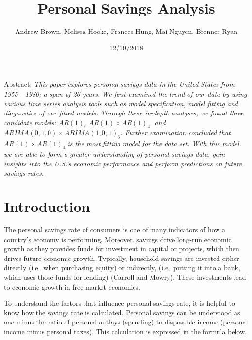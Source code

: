 \documentclass[]{article}
\title{Personal Savings Analysis}
\author{Andrew Brown, Melissa Hooke, Frances Hung, Mai Nguyen, Brenner Ryan}
\date{12/19/2018}
\begin{document}
\maketitle

Abstract:
\textit{This paper explores personal savings data in the United States from 1955 - 1980; a span of 26 years. We first examined the trend of our data by using various time series analysis tools such as model specification, model fitting and diagnostics of our fitted models. Through these in-depth analyses, we found three candidate models: $AR(1)$, $AR(1) \times AR(1)_4$, and $ARIMA(0,1,0) \times ARIMA(1,0,1)_6$. Further examination concluded that $AR(1) \times AR(1)_4$ is the most fitting model for the data set. With this model, we are able to form a greater understanding of personal savings data, gain insights into the U.S.’s economic performance and perform predictions on future savings rates.}

\newpage

\section{Introduction}\label{introduction}

The personal savings rate of consumers is one of many indicators of how
a country's economy is performing. Moreover, savings drive long-run
economic growth as they provides funds for investment in capital or
projects, which then drives future economic growth. Typically, household
savings are invested either directly (i.e.~when purchasing equity) or
indirectly, (i.e.~putting it into a bank, which uses those funds for
lending) (Carroll and Mowry). These investments lead to economic growth
in free-market economies.

To understand the factors that influence personal savings rate, it is
helpful to know how the savings rate is calculated. Personal savings can
be understood as one minus the ratio of personal outlays (spending) to
disposable income (personal income minus personal taxes). This
calculation is expressed in the formula below.
\end{document}
